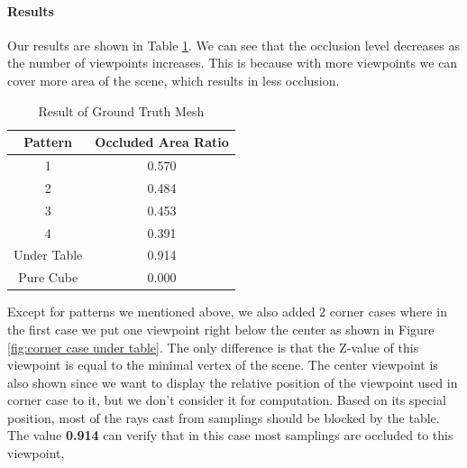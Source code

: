 \documentclass[11pt, a4paper,oneside,chapterprefix=false]{scrbook}
\begin{document}
\vspace{20pt}

\paragraph{Results}

Our results are shown in Table \ref{tab:result of each experiment}. We can see that the occlusion level decreases as the number of viewpoints increases. This is because with more viewpoints we can cover more area of the scene, which results in less occlusion.

\vspace{10pt}

\begin{table}[h]
    \centering
    \begin{tabular}{|c|c|}
        \hline
        \textbf{Pattern} & \textbf{Occluded Area Ratio} \\
        \hline
        1 & 0.570 \\
        2 & 0.484 \\
		3 & 0.453 \\
		4 & 0.391 \\
        Under Table & 0.914 \\
        Pure Cube & 0.000 \\

        \hline
    \end{tabular}
    \caption{Result of Ground Truth Mesh}
    \label{tab:result of each experiment}
\end{table}

\vspace{10pt}

Except for patterns we mentioned above, we also added 2 corner cases where in the first case we put one viewpoint right below the center as shown in Figure \ref{fig:corner case under table}. The only difference is that the Z-value of this viewpoint is equal to the minimal vertex of the scene. The center viewpoint is also shown since we want to display the relative position of the viewpoint used in corner case to it, but we don't consider it for computation. Based on its special position, most of the rays cast from samplings should be blocked by the table. The value \textbf{0.914} can verify that in this case most samplings are occluded to this viewpoint, 
\end{document}
